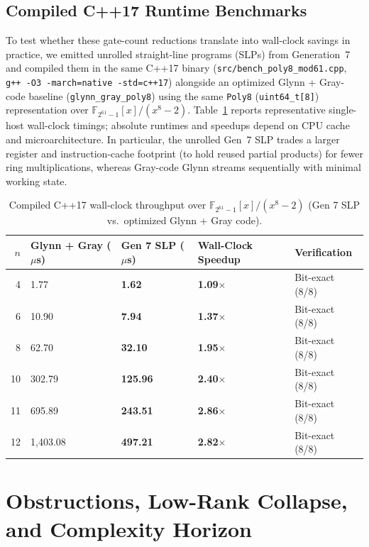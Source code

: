 \documentclass[11pt,a4paper]{article}
\begin{document}
\subsection{Compiled C++17 Runtime Benchmarks}

To test whether these gate-count reductions translate into wall-clock savings in practice, we emitted unrolled straight-line programs (SLPs) from Generation~7 and compiled them in the same C++17 binary (\texttt{src/bench\_\-poly8\_\-mod61.cpp}, \texttt{g++ -O3 -march=native -std=c++17}) alongside an optimized Glynn + Gray-code baseline (\texttt{glynn\_\-gray\_\-poly8}) using the same \texttt{Poly8} (\texttt{uint64\_t[8]}) representation over $\mathbb{F}_{2^{61}-1}[x]/(x^8 - 2)$. Table~\ref{tab:cpp_bench} reports representative single-host wall-clock timings; absolute runtimes and speedups depend on CPU cache and microarchitecture. In particular, the unrolled Gen~7 SLP trades a larger register and instruction-cache footprint (to hold reused partial products) for fewer ring multiplications, whereas Gray-code Glynn streams sequentially with minimal working state.

\begin{table}[!htbp]
\centering
\caption{Compiled C++17 wall-clock throughput over $\mathbb{F}_{2^{61}-1}[x]/(x^8 - 2)$ (Gen 7 SLP vs.\ optimized Glynn + Gray code).}
\label{tab:cpp_bench}
\begin{tabularx}{\linewidth}{rXXXX}
\toprule
$n$ & Glynn + Gray ($\mu$s) & Gen 7 SLP ($\mu$s) & Wall-Clock Speedup & Verification \\
\midrule
4  & 1.77     & \textbf{1.62}   & \textbf{1.09$\times$} & Bit-exact (8/8) \\
6  & 10.90    & \textbf{7.94}   & \textbf{1.37$\times$} & Bit-exact (8/8) \\
8  & 62.70    & \textbf{32.10}  & \textbf{1.95$\times$} & Bit-exact (8/8) \\
10 & 302.79   & \textbf{125.96} & \textbf{2.40$\times$} & Bit-exact (8/8) \\
11 & 695.89   & \textbf{243.51} & \textbf{2.86$\times$} & Bit-exact (8/8) \\
12 & 1,403.08 & \textbf{497.21} & \textbf{2.82$\times$} & Bit-exact (8/8) \\
\bottomrule
\end{tabularx}
\end{table}

\section{Obstructions, Low-Rank Collapse, and Complexity Horizon}
\end{document}
